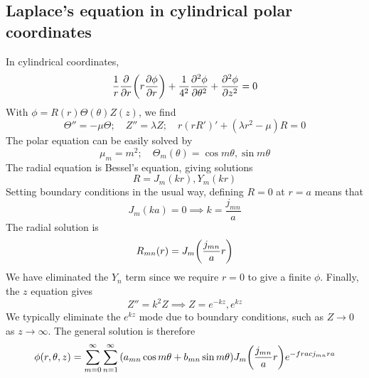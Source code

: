 \subsection{Laplace's equation in cylindrical polar coordinates}
In cylindrical coordinates,
\[
	\frac{1}{r} \pdv{r} \qty(r \pdv{\phi}{r}) + \frac{1}{4^2} \pdv[2]{\phi}{\theta} + \pdv[2]{\phi}{z} = 0
\]
With \( \phi = R(r) \Theta(\theta) Z(z) \), we find
\[
	\Theta'' = -\mu \Theta;\quad Z'' = \lambda Z;\quad r(rR')' + (\lambda r^2 - \mu) R = 0
\]
The polar equation can be easily solved by
\[
	\mu_m = m^2;\quad \Theta_m(\theta) = \cos m\theta, \sin m\theta
\]
The radial equation is Bessel's equation, giving solutions
\[
	R = J_m(kr), Y_m(kr)
\]
Setting boundary conditions in the usual way, defining \( R=0 \) at \( r = a \) means that
\[
	J_m(ka) = 0 \implies k = \frac{j_{mn}}{a}
\]
The radial solution is
\[
	R_{mn}(r) = J_m\qty(\frac{j_{mn}}{a}r)
\]
We have eliminated the \( Y_n \) term since we require \( r = 0 \) to give a finite \( \phi \).
Finally, the \( z \) equation gives
\[
	Z'' = k^2 Z \implies Z = e^{-kz}, e^{kz}
\]
We typically eliminate the \( e^{kz} \) mode due to boundary conditions, such as \( Z \to 0 \) as \( z \to \infty \).
The general solution is therefore
\[
	\phi(r,\theta,z) = \sum_{m=0}^\infty \sum_{n = 1}^\infty \qty(a_{mn} \cos m\theta + b_{mn} \sin m\theta) J_m\qty(\frac{j_{mn}}{a} r) e^{-frac{j_{mn}r}{a}}
\]

